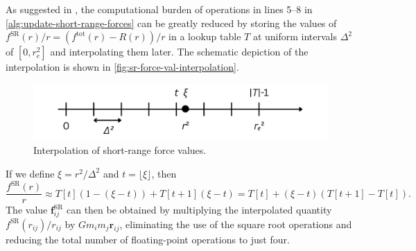 As suggested in \cite{Hockney1988}, the computational burden of operations in lines 5--8 in \autoref{alg:update-short-range-forces} can be greatly reduced by storing the values of $f^\text{SR}(r) / r = (f^\text{tot}(r) - R(r)) / r$ in a lookup table $T$ at uniform intervals $\Delta^2$ of $[0, r_e^2]$ and interpolating them later.
The schematic depiction of the interpolation is shown in \autoref{fig:sr-force-val-interpolation}.
\begin{figure}[htp]
    \centering
    \includegraphics[scale=0.2]{chapters/p3m-method/img/interpolation.png}
    \caption{Interpolation of short-range force values.}
    \label{fig:sr-force-val-interpolation}
\end{figure}
If we define $\xi = r^2 / \Delta^2$ and $t=\lfloor \xi \rfloor$, then
\begin{equation*}
    \frac{f^\text{SR}(r)}{r} \approx T[t]\left(1 - (\xi - t)\right) + T[t+1](\xi - t)
    = T[t] + (\xi - t) (T[t+1] - T[t]).
\end{equation*}
The value $\mathbf{f}^\text{SR}_{ij}$ can then be obtained by multiplying the interpolated quantity $f^\text{SR}(r_{ij})/r_{ij}$ by $G m_i m_j \mathbf{r}_{ij}$, eliminating the use of the square root operations and reducing the total number of floating-point operations to just four.

